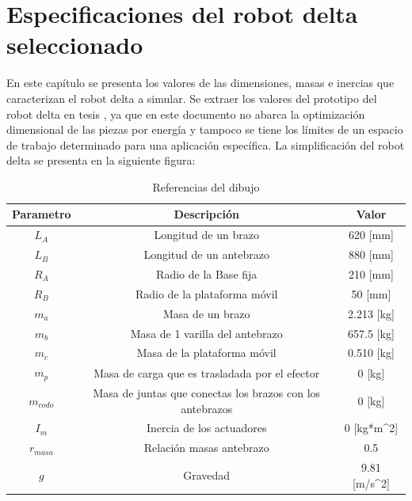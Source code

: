 \chapter{Especificaciones del robot delta seleccionado}\label{CAP5}
En este capítulo se presenta los valores de las dimensiones, masas e inercias que caracterizan el robot delta a simular. Se extraer los valores del prototipo del robot delta en tesis \cite{}, ya que en este documento no abarca la optimización dimensional de las piezas por energía y tampoco se tiene los límites de un espacio de trabajo determinado para una aplicación específica. La simplificación del robot delta se presenta en la siguiente figura:

    \begingroup
        \renewcommand{\arraystretch}{1.5}
        \begin{table}[H]
        \centering
        \begin{tabular}{c c{4cm} c}
           \hline
           \textbf{Parametro}  & \multicolumn{1}{c}{\textbf{Descripción}} & Valor \\\hline\hline
            $L_A$  & Longitud de un brazo           & 620 [mm]                        \\\hline
            $L_B$  & Longitud de un antebrazo       & 880 [mm]                         \\\hline
            $R_A$  & Radio de la Base fija           & 210 [mm]                         \\\hline
            $R_B$  & Radio de la plataforma móvil    & 50 [mm]                         \\\hline
            $m_a$  & Masa de un brazo                & 2.213 [kg]                         \\\hline
            $m_b$  & Masa de 1 varilla del antebrazo  & 657.5 [kg]                         \\\hline
            $m_c$  & Masa de la plataforma móvil     & 0.510 [kg]                         \\\hline
            $m_p$  & Masa de carga que es trasladada por el efector & 0 [kg]           \\\hline
            $m_{codo}$  & Masa de juntas que conectas los brazos con los antebrazos  & 0 [kg]  \\\hline
            $I_m$  & Inercia de los actuadores           &   0 [kg*m^2]     \\\hline
            $r_{masa}$  & Relación masas antebrazo           & 0.5        \\\hline
            $g$  & Gravedad           & 9.81  [m/s^2]                      \\\hline
        \end{tabular}
        \caption{Referencias del dibujo}
        \label{tab:cap5_tabla_1}
    \end{table}
    \endgroup
    
